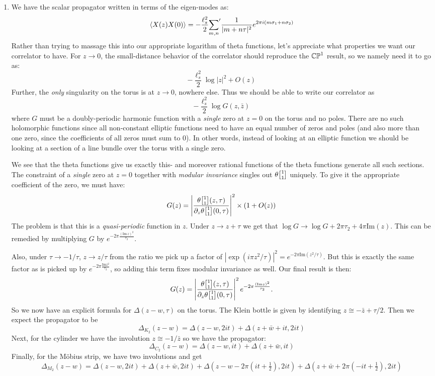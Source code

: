 \documentclass[11pt]{article}
\begin{document}
\begin{enumerate}
	
	\item We have the scalar propagator written in terms of the eigen-modes as:
	\[
		\braket{X(z) X(0)} = -\frac{\ell_s^2}{2} {\sum_{m,n}}' \frac{1}{|m + n \tau|^2} e^{2\pi i (m \sigma_1 + n \sigma_2)}
	\]
	Rather than trying to massage this into our appropriate logarithm of theta functions, let's appreciate what properties we want our correlator to have. For $z \to 0$, the small-distance behavior of the correlator should reproduce the $\mathbb{CP}^1$ result, so we namely need it to go as:
	\[
		 - \frac{\ell_s^2}{2} \log|z|^2 + O(z)
	\]
	Further, the \emph{only} singularity on the torus is at $z \to 0$, nowhere else. Thus we should be able to write our correlator as 
	\[
		- \frac{\ell_s^2}{2} \log G(z, \bar z)
	\]
	where $G$ must be a doubly-periodic harmonic function with a \emph{single} zero at $z=0$ on the torus and no poles. There are no such holomorphic functions since all non-constant elliptic functions need to have an equal number of zeros and poles (and also more than one zero, since the coefficients of all zeros must sum to 0). In other words, instead of looking at an elliptic function we should be looking at a section of a line bundle over the torus with a single zero. 
	
	We see that the theta functions give us exactly this- and moreover rational functions of the theta functions generate all such sections. The constraint of a \emph{single} zero at $z=0$ together with \emph{modular invariance} singles out $\theta\twist11$ uniquely. To give it the appropriate coefficient of the zero, we must have:
	\[
		G(z) = \left|\frac{\theta\twist11(z, \tau)}{\d_z \theta\twist11(0, \tau)} \right|^2 \times (1 + O(z))
	\]
	The problem is that this is a \emph{quasi-periodic} function in $z$. Under $z \to z + \tau$ we get that $\log G \to \log G + 2 \pi \tau_2 + 4 \pi \mathrm{Im}(z)$. This can be remedied by multiplying $G$ by $e^{- 2 \pi \frac{(\mathrm{Im}\, z)^2}{\tau_2}}$. 
	
	Also,  under $\tau \to -1/\tau$, $z \to z/\tau$ from the ratio we pick up a factor of $|\exp(i \pi z^2/\tau)|^2 = e^{- 2 \pi \mathrm{Im} (z^2/\tau)}$. But this is exactly the same factor as is picked up by $e^{-2 \pi \frac{\mathrm{Im} z^2}{\tau_2}}$, so adding this term fixes modular invariance as well.
	 Our final result is then:
	\[
		G(z) = \left|\frac{\theta\twist11(z, \tau)}{\d_z \theta\twist11(0, \tau)} \right|^2 e^{-2 \pi \frac{(\mathrm{Im} z)^2}{\tau_2}}.
	\]
	So we now have an explicit formula for $\Delta(z - w, \tau)$ on the torus. The Klein bottle is given by identifying $z \cong - \bar z + \tau/2$. Then we expect the propagator to be
	\[
		\Delta_{K_2}(z- w) = \Delta(z - w, 2 i t) + \Delta(z + \bar w + i t, 2 i t)
	\] 
	Next, for the cylinder we have the involution $z \cong -1/\bar z$ so we have the propagator:
	\[
		\Delta_{C_2}(z- w) = \Delta(z - w, i t) + \Delta(z + \bar w, i t)
	\]
	Finally, for the M\"obius strip, we have two involutions and get
	\[
		\Delta_{M_2}(z- w) = \Delta(z - w, 2 i t) + \Delta(z + \bar w, 2 i t) + \Delta(z - w - 2 \pi (i t + \tfrac12) , 2 i t) + \Delta(z + \bar w + 2 \pi (-i t + \tfrac12) , 2 i t)
	\]
	

\end{enumerate}
\end{document}
